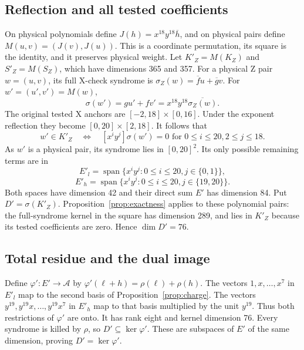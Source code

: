 \documentclass{article}
\DeclareMathOperator{\Span}{span}
\begin{document}
\subsection{Reflection and all tested coefficients}\label{sec:z-reflection}

On physical polynomials define
\(J(h)=x^{18}y^{18}\overline{h}\), and on physical pairs define
\(M(u,v)=(J(v),J(u))\). This is a coordinate permutation, its square is
the identity, and it preserves physical weight.
Let \(K'_Z=M(K_Z)\) and \(S'_Z=M(S_Z)\), which have dimensions 365 and 357.
For a physical Z pair \(w=(u,v)\), its full X-check syndrome is
\(\sigma_Z(w)=\overline{f}u+\overline{g}v\).
For \(w'=(u',v')=M(w)\),
\begin{equation}
  \sigma(w')=gu'+fv'=x^{18}y^{18}\overline{\sigma_Z(w)}.
\end{equation}
The original tested X anchors are \([-2,18]\times[0,16]\).
Under the exponent reflection they become \([0,20]\times[2,18]\).
It follows that
\begin{equation}
  w'\in K'_Z \quad\Longleftrightarrow\quad
  [x^iy^j]\sigma(w')=0
  \text{ for } 0\le i\le 20, 2\le j\le 18.
\end{equation}
As \(w'\) is a physical pair, its syndrome lies in \([0,20]^2\).
Its only possible remaining terms are in
\begin{equation}
  E'_l=\Span\{x^iy^j:0\le i\le 20, j\in\{0,1\}\},
\end{equation}
\begin{equation}
  E'_h=\Span\{x^iy^j:0\le i\le 20, j\in\{19,20\}\}.
\end{equation}
Both spaces have dimension 42 and their direct sum \(E'\) has dimension 84.
Put \(D'=\sigma(K'_Z)\). Proposition~\ref{prop:exactness} applies to these
polynomial pairs: the full-syndrome kernel in the square has dimension 289, and
lies in \(K'_Z\) because its tested coefficients are zero. Hence \(\dim D'=76\).

\subsection{Total residue and the dual image}\label{sec:z-residue}

Define \(\varphi'\colon E'\to\mathcal{A}\) by
\(\varphi'(\ell+h)=\rho(\ell)+\rho(h)\).
The vectors \(1,x,\dots,x^7\) in \(E'_l\) map to the second basis of
Proposition~\ref{prop:charge}. The vectors \(y^{19},y^{19}x,\dots,y^{19}x^7\) in
\(E'_h\) map to that basis multiplied by the unit \(y^{19}\).
Thus both restrictions of \(\varphi'\) are onto. It has rank eight and
kernel dimension 76.
Every syndrome is killed by \(\rho\), so \(D'\subseteq\ker\varphi'\).
These are subspaces of \(E'\) of the same dimension, proving
\(D'=\ker\varphi'\).
\end{document}
